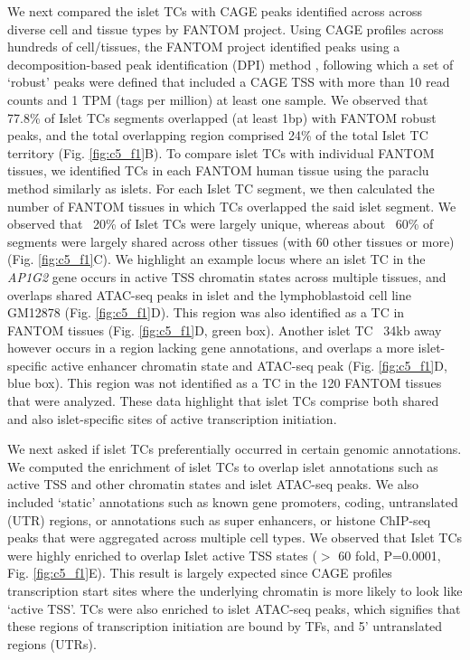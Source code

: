 We next compared the islet TCs with CAGE peaks identified across across diverse cell and tissue types by FANTOM project. Using CAGE profiles across hundreds of cell/tissues, the FANTOM project identified peaks using a decomposition-based peak identification (DPI) method \cite{clstdgtPromoterlevelMammalianExpression2014}, following which a set of ‘robust’ peaks were defined that included a CAGE TSS with more than 10 read counts and 1 TPM (tags per million) at least one sample. We observed that 77.8\% of Islet TCs segments overlapped (at least 1bp) with FANTOM robust peaks, and the total overlapping region comprised 24\% of the total Islet TC territory (Fig. \ref{fig:c5_f1}B). To compare islet TCs with individual FANTOM tissues, we identified TCs in each FANTOM human tissue using the paraclu method similarly as islets. For each Islet TC segment, we then calculated the number of FANTOM tissues in which TCs overlapped the said islet segment. We observed that ~20\% of Islet TCs were largely unique, whereas about ~60\% of segments were largely shared across other tissues (with 60 other tissues or more)(Fig. \ref{fig:c5_f1}C). We highlight an example locus where an islet TC in the \textit{AP1G2} gene occurs in active TSS chromatin states across multiple tissues, and overlaps shared ATAC-seq peaks in islet and the lymphoblastoid cell line GM12878 \cite{buenrostroTranspositionNativeChromatin2013} (Fig. \ref{fig:c5_f1}D). This region was also identified as a TC in FANTOM tissues (Fig. \ref{fig:c5_f1}D, green box). Another islet TC ~34kb away however occurs in a region lacking gene annotations, and overlaps a more islet-specific active enhancer chromatin state and ATAC-seq peak (Fig. \ref{fig:c5_f1}D, blue box). This region was not identified as a TC in the 120 FANTOM tissues that were analyzed. These data highlight that islet TCs comprise both shared and also islet-specific sites of active transcription initiation.   


We next asked if islet TCs preferentially occurred in certain genomic annotations. We computed the enrichment of islet TCs to overlap islet annotations such as active TSS and other chromatin states and islet ATAC-seq peaks. We also included ‘static’ annotations such as known gene promoters, coding, untranslated (UTR) regions, or annotations such as super enhancers, or histone ChIP-seq peaks that were aggregated across multiple cell types. We observed that Islet TCs were highly enriched to overlap Islet active TSS states ($>$ 60 fold, P=0.0001, Fig. \ref{fig:c5_f1}E). This result is largely expected since CAGE profiles transcription start sites where the underlying chromatin is more likely to look like ‘active TSS’. TCs were also enriched to islet ATAC-seq peaks, which signifies that these regions of transcription initiation are bound by TFs, and 5’ untranslated regions (UTRs). 


